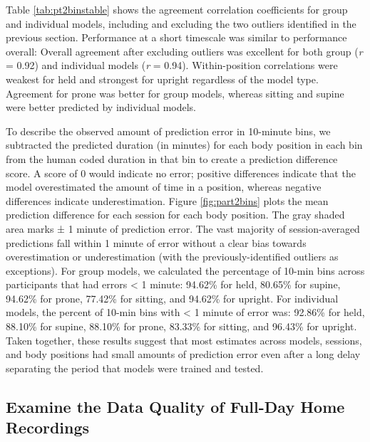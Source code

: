\documentclass[
  man]{apa6}
\begin{document}
Table \ref{tab:pt2binstable} shows the agreement correlation coefficients for group and individual models, including and excluding the two outliers identified in the previous section. Performance at a short timescale was similar to performance overall: Overall agreement after excluding outliers was excellent for both group (\emph{r} = 0.92) and individual models (\emph{r} = 0.94). Within-position correlations were weakest for held and strongest for upright regardless of the model type. Agreement for prone was better for group models, whereas sitting and supine were better predicted by individual models.

To describe the observed amount of prediction error in 10-minute bins, we subtracted the predicted duration (in minutes) for each body position in each bin from the human coded duration in that bin to create a prediction difference score. A score of 0 would indicate no error; positive differences indicate that the model overestimated the amount of time in a position, whereas negative differences indicate underestimation. Figure \ref{fig:part2bins} plots the mean prediction difference for each session for each body position. The gray shaded area marks ± 1 minute of prediction error. The vast majority of session-averaged predictions fall within 1 minute of error without a clear bias towards overestimation or underestimation (with the previously-identified outliers as exceptions). For group models, we calculated the percentage of 10-min bins across participants that had errors \textless{} 1 minute: 94.62\% for held, 80.65\% for supine, 94.62\% for prone, 77.42\% for sitting, and 94.62\% for upright. For individual models, the percent of 10-min bins with \textless{} 1 minute of error was: 92.86\% for held, 88.10\% for supine, 88.10\% for prone, 83.33\% for sitting, and 96.43\% for upright. Taken together, these results suggest that most estimates across models, sessions, and body positions had small amounts of prediction error even after a long delay separating the period that models were trained and tested.

\hypertarget{examine-the-data-quality-of-full-day-home-recordings}{%
\subsection{Examine the Data Quality of Full-Day Home Recordings}\label{examine-the-data-quality-of-full-day-home-recordings}}
\end{document}
